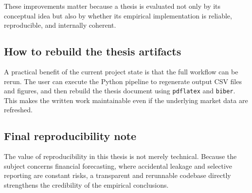 These improvements matter because a thesis is evaluated not only by its conceptual idea but also by whether its empirical implementation is reliable, reproducible, and internally coherent.

\subsection{How to rebuild the thesis artifacts}

A practical benefit of the current project state is that the full workflow can be rerun. The user can execute the Python pipeline to regenerate output CSV files and figures, and then rebuild the thesis document using \texttt{pdflatex} and \texttt{biber}. This makes the written work maintainable even if the underlying market data are refreshed.

\subsection{Final reproducibility note}

The value of reproducibility in this thesis is not merely technical. Because the subject concerns financial forecasting, where accidental leakage and selective reporting are constant risks, a transparent and rerunnable codebase directly strengthens the credibility of the empirical conclusions.
